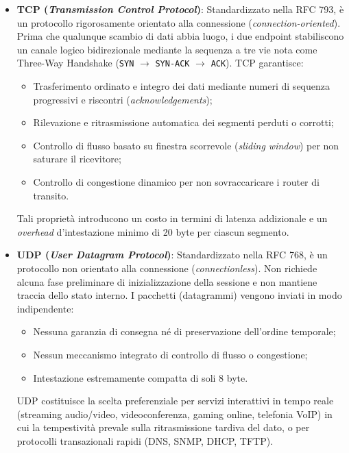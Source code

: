 \documentclass[11pt, a4paper]{article}
\begin{document}
\begin{itemize}
    \item \textbf{TCP (\emph{Transmission Control Protocol})}: Standardizzato nella RFC 793, è un protocollo rigorosamente orientato alla connessione (\emph{connection-oriented}). Prima che qualunque scambio di dati abbia luogo, i due endpoint stabiliscono un canale logico bidirezionale mediante la sequenza a tre vie nota come Three-Way Handshake (\texttt{SYN} $\to$ \texttt{SYN-ACK} $\to$ \texttt{ACK}). TCP garantisce:
    \begin{itemize}[noitemsep]
        \item Trasferimento ordinato e integro dei dati mediante numeri di sequenza progressivi e riscontri (\emph{acknowledgements});
        \item Rilevazione e ritrasmissione automatica dei segmenti perduti o corrotti;
        \item Controllo di flusso basato su finestra scorrevole (\emph{sliding window}) per non saturare il ricevitore;
        \item Controllo di congestione dinamico per non sovraccaricare i router di transito.
    \end{itemize}
    Tali proprietà introducono un costo in termini di latenza addizionale e un \emph{overhead} d'intestazione minimo di 20 byte per ciascun segmento.

    \item \textbf{UDP (\emph{User Datagram Protocol})}: Standardizzato nella RFC 768, è un protocollo non orientato alla connessione (\emph{connectionless}). Non richiede alcuna fase preliminare di inizializzazione della sessione e non mantiene traccia dello stato interno. I pacchetti (datagrammi) vengono inviati in modo indipendente:
    \begin{itemize}[noitemsep]
        \item Nessuna garanzia di consegna né di preservazione dell'ordine temporale;
        \item Nessun meccanismo integrato di controllo di flusso o congestione;
        \item Intestazione estremamente compatta di soli 8 byte.
    \end{itemize}
    UDP costituisce la scelta preferenziale per servizi interattivi in tempo reale (streaming audio/video, videoconferenza, gaming online, telefonia VoIP) in cui la tempestività prevale sulla ritrasmissione tardiva del dato, o per protocolli transazionali rapidi (DNS, SNMP, DHCP, TFTP).
\end{itemize}
\end{document}
